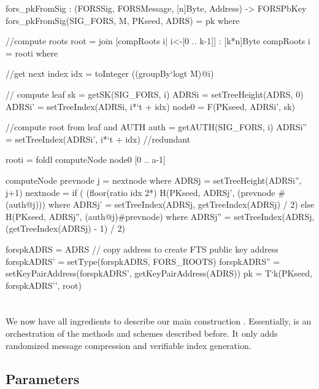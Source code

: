 \begin{code}
  fors_pkFromSig : (FORSSig, FORSMessage, [n]Byte, Address) -> FORSPbKey
  fors_pkFromSig(SIG_FORS, M, PKseed, ADRS) = pk where

    //compute roots
    root = join [compRoots i| i<-[0 .. k-1]] : [k*n]Byte
    compRoots i = rooti where

      //get next index
      idx = toInteger ((groupBy`{logt} M)@i)

      // compute leaf
      sk = getSK(SIG_FORS, i)
      ADRSi = setTreeHeight(ADRS, 0)
      ADRSi' = setTreeIndex(ADRSi, i*`t + idx)
      node0 = F(PKseed, ADRSi', sk)

      //compute root from leaf and AUTH
      auth = getAUTH(SIG_FORS, i)
      ADRSi'' = setTreeIndex(ADRSi', i*`t + idx) //redundant

      rooti = foldl computeNode node0 [0 .. a-1]

      computeNode prevnode j = nextnode where 
        ADRSj = setTreeHeight(ADRSi'', j+1)
        nextnode =
          if ( (floor(ratio idx 2^^j) %
            H(PKseed, ADRSj', (prevnode # (auth@j))) where
              ADRSj' = setTreeIndex(ADRSj, getTreeIndex(ADRSj) / 2)
          else
            H(PKseed, ADRSj'', (auth@j)#prevnode) where
              ADRSj'' = setTreeIndex(ADRSj, (getTreeIndex(ADRSj) - 1) / 2)

    forspkADRS = ADRS // copy address to create FTS public key address
    forspkADRS' = setType(forspkADRS, FORS_ROOTS)
    forspkADRS'' = setKeyPairAddress(forspkADRS', getKeyPairAddress(ADRS))
    pk = T`{k}(PKseed, forspkADRS'', root)
\end{code}

\section{\spx}
\label{sec:spx}
We now have all ingredients to describe our main construction \spx. 
Essentially, \spx is an orchestration of the methods and schemes described 
before. It only adds randomized message compression and verifiable index
generation. 

\subsection{\spx Parameters}

